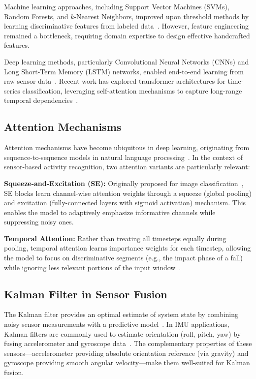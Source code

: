 \documentclass[journal,12pt]{IEEEtran}
\begin{document}
Machine learning approaches, including Support Vector Machines (SVMs), Random Forests, and $k$-Nearest Neighbors, improved upon threshold methods by learning discriminative features from labeled data~\cite{abbate2012smartphone}. However, feature engineering remained a bottleneck, requiring domain expertise to design effective handcrafted features.

Deep learning methods, particularly Convolutional Neural Networks (CNNs) and Long Short-Term Memory (LSTM) networks, enabled end-to-end learning from raw sensor data~\cite{musci2020online}. Recent work has explored transformer architectures for time-series classification, leveraging self-attention mechanisms to capture long-range temporal dependencies~\cite{zerveas2021transformer}.

\subsection{Attention Mechanisms}

Attention mechanisms have become ubiquitous in deep learning, originating from sequence-to-sequence models in natural language processing~\cite{vaswani2017attention}. In the context of sensor-based activity recognition, two attention variants are particularly relevant:

\textbf{Squeeze-and-Excitation (SE):} Originally proposed for image classification~\cite{hu2018squeeze}, SE blocks learn channel-wise attention weights through a squeeze (global pooling) and excitation (fully-connected layers with sigmoid activation) mechanism. This enables the model to adaptively emphasize informative channels while suppressing noisy ones.

\textbf{Temporal Attention:} Rather than treating all timesteps equally during pooling, temporal attention learns importance weights for each timestep, allowing the model to focus on discriminative segments (e.g., the impact phase of a fall) while ignoring less relevant portions of the input window~\cite{gao2021danhar}.

\subsection{Kalman Filter in Sensor Fusion}

The Kalman filter provides an optimal estimate of system state by combining noisy sensor measurements with a predictive model~\cite{kalman1960new}. In IMU applications, Kalman filters are commonly used to estimate orientation (roll, pitch, yaw) by fusing accelerometer and gyroscope data~\cite{madgwick2011estimation}. The complementary properties of these sensors---accelerometer providing absolute orientation reference (via gravity) and gyroscope providing smooth angular velocity---make them well-suited for Kalman fusion.
\end{document}
